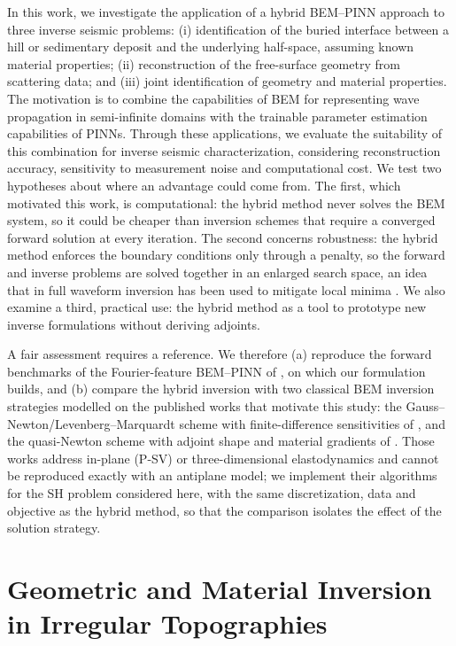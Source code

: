 \documentclass[11pt,twoside]{article}
\begin{document}
In this work, we investigate the application of a hybrid BEM–PINN approach to three inverse seismic problems: (i) identification of the buried interface between a hill or sedimentary deposit and the underlying half-space, assuming known material properties; (ii) reconstruction of the free-surface geometry from scattering data; and (iii) joint identification of geometry and material properties. The motivation is to combine the capabilities of BEM for representing wave propagation in semi-infinite domains with the trainable parameter estimation capabilities of PINNs. Through these applications, we evaluate the suitability of this combination for inverse seismic characterization, considering reconstruction accuracy, sensitivity to measurement noise and computational cost. We test two hypotheses about where an advantage could come from. The first, which motivated this work, is computational: the hybrid method never solves the BEM system, so it could be cheaper than inversion schemes that require a converged forward solution at every iteration. The second concerns robustness: the hybrid method enforces the boundary conditions only through a penalty, so the forward and inverse problems are solved together in an enlarged search space, an idea that in full waveform inversion has been used to mitigate local minima \citep{Haber2000,vanLeeuwen2013}. We also examine a third, practical use: the hybrid method as a tool to prototype new inverse formulations without deriving adjoints.

A fair assessment requires a reference. We therefore (a) reproduce the forward benchmarks of the Fourier-feature BEM–PINN of \citet{wu_novel_2026}, on which our formulation builds, and (b) compare the hybrid inversion with two classical BEM inversion strategies modelled on the published works that motivate this study: the Gauss–Newton/Levenberg–Marquardt scheme with finite-difference sensitivities of \citet{Bignardi2012}, and the quasi-Newton scheme with adjoint shape and material gradients of \citet{Bonnet2009}. Those works address in-plane (P-SV) or three-dimensional elastodynamics and cannot be reproduced exactly with an antiplane model; we implement their algorithms for the SH problem considered here, with the same discretization, data and objective as the hybrid method, so that the comparison isolates the effect of the solution strategy.

\section{Geometric and Material Inversion in Irregular Topographies}\label{sec:problem_statement}
\end{document}
